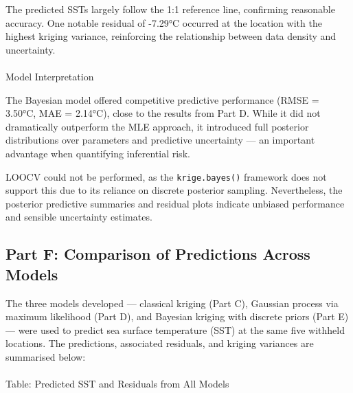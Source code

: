 \documentclass[
  11pt,
]{article}
\makeatletter
\let\oldparagraph\paragraph
\renewcommand{\paragraph}{
    \@ifstar
      \xxxParagraphStar
      \xxxParagraphNoStar
  }
\newcommand{\xxxParagraphStar}[1]{\oldparagraph*{#1}\mbox{}}
\newcommand{\xxxParagraphNoStar}[1]{\oldparagraph{#1}\mbox{}}
\makeatother
\begin{document}
The predicted SSTs largely follow the 1:1 reference line, confirming
reasonable accuracy. One notable residual of -7.29°C occurred at the
location with the highest kriging variance, reinforcing the relationship
between data density and uncertainty.

\paragraph{Model Interpretation}\label{model-interpretation}

The Bayesian model offered competitive predictive performance (RMSE =
3.50°C, MAE = 2.14°C), close to the results from Part D. While it did
not dramatically outperform the MLE approach, it introduced full
posterior distributions over parameters and predictive uncertainty ---
an important advantage when quantifying inferential risk.

LOOCV could not be performed, as the \texttt{krige.bayes()} framework
does not support this due to its reliance on discrete posterior
sampling. Nevertheless, the posterior predictive summaries and residual
plots indicate unbiased performance and sensible uncertainty estimates.

\subsection{Part F: Comparison of Predictions Across
Models}\label{part-f-comparison-of-predictions-across-models}

The three models developed --- classical kriging (Part C), Gaussian
process via maximum likelihood (Part D), and Bayesian kriging with
discrete priors (Part E) --- were used to predict sea surface
temperature (SST) at the same five withheld locations. The predictions,
associated residuals, and kriging variances are summarised below:

\paragraph{Table: Predicted SST and Residuals from All
Models}\label{table-predicted-sst-and-residuals-from-all-models}
\end{document}
